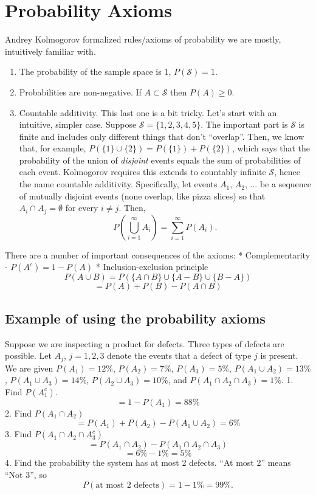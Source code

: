 \documentclass[]{book}
\providecommand{\tightlist}{%
  \setlength{\itemsep}{0pt}\setlength{\parskip}{0pt}}
\begin{document}
\section{Probability Axioms}\label{probability-axioms}

Andrey Kolmogorov formalized rules/axioms of probability we are mostly,
intuitively familiar with.

\begin{enumerate}
\def\labelenumi{\arabic{enumi}.}
\tightlist
\item
  The probability of the sample space is 1, \(P(\mathcal{S})=1\).
\item
  Probabilities are non-negative. If \(A\subset\mathcal{S}\) then
  \(P(A)\geq 0\).
\item
  Countable additivity. This last one is a bit tricky. Let's start with
  an intuitive, simpler case. Suppose \(\mathcal{S} = \{1,2,3,4,5\}\).
  The important part is \(\mathcal{S}\) is finite and includes only
  different things that don't ``overlap''. Then, we know that, for
  example, \(P(\{1\}\cup \{2\}) = P(\{1\}) + P(\{2\})\), which says that
  the probability of the union of \emph{disjoint} events equals the sum
  of probabilities of each event. Kolmogorov requires this extends to
  countably infinite \(\mathcal{S}\), hence the name countable
  additivity. Specifically, let events \(A_1\), \(A_2\), \(\ldots\) be a
  sequence of mutually disjoint events (none overlap, like pizza slices)
  so that \(A_i \cap A_j = \emptyset\) for every \(i\ne j\). Then,
  \[P\left(\bigcup_{i=1}^\infty A_i\right) = \sum_{i=1}^\infty P(A_i).\]
\end{enumerate}

There are a number of important consequences of the axioms: *
Complementarity - \(P(A^c) = 1-P(A)\) * Inclusion-exclusion principle
\[P(A\cup B) = P(\{A\cap B\}\cup\{A-B\}\cup\{B-A\})\]
\[ = P(A)+P(B)-P(A\cap B)\]

\subsection{Example of using the probability
axioms}\label{example-of-using-the-probability-axioms}

Suppose we are inspecting a product for defects. Three types of defects
are possible. Let \(A_j\), \(j=1, 2, 3\) denote the events that a defect
of type \(j\) is present. We are given \(P(A_1) = 12\%\),
\(P(A_2) = 7\%\), \(P(A_3) = 5\%\), \(P(A_1\cup A_2) = 13\%\),
\(P(A_1 \cup A_3) = 14\%\), \(P(A_2 \cup A_3) = 10\%\), and
\(P(A_1\cap A_2\cap A_3) = 1\%\). 1. Find \(P(A_1^c)\).
\[ = 1-P(A_1) = 88\%\] 2. Find \(P(A_1\cap A_2)\)
\[ = P(A_1) + P(A_2) - P(A_1\cup A_2) = 6\%\] 3. Find
\(P(A_1 \cap A_2 \cap A_3^c)\)
\[ = P(A_1\cap A_2) - P(A_1\cap A_2 \cap A_3)\] \[ = 6\% - 1\% = 5\%\]
4. Find the probability the system has at most 2 defects. ``At most 2''
means ``Not 3'', so \[P(\text{at most 2 defects}) = 1 - 1\% = 99\%.\]
\end{document}
